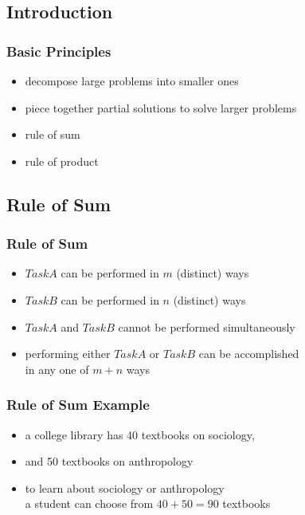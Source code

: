 \documentclass[dvipsnames]{beamer}
\begin{document}
\subsection{Introduction}

\begin{frame}
  \frametitle{Basic Principles}

  \begin{itemize}
    \item decompose large problems into smaller ones
    \item piece together partial solutions to solve larger problems

    \pause
    \bigskip
    \item rule of sum
    \item rule of product
  \end{itemize}
\end{frame}

\subsection{Rule of Sum}

\begin{frame}
  \frametitle{Rule of Sum}

  \begin{itemize}
    \item $TaskA$ can be performed in $m$ (distinct) ways
    \item $TaskB$ can be performed in $n$ (distinct) ways
    \item $TaskA$ and $TaskB$ cannot be performed simultaneously

    \pause
    \bigskip
    \item performing either $TaskA$ or $TaskB$ can be accomplished\\
      in any one of $m+n$ ways
  \end{itemize}
\end{frame}

\begin{frame}
  \frametitle{Rule of Sum Example}

  \begin{itemize}
    \item a college library has 40 textbooks on sociology,
    \item and 50 textbooks on anthropology

    \medskip
    \item to learn about sociology or anthropology\\
      a student can choose from $40 + 50 = 90$ textbooks
  \end{itemize}
\end{frame}
\end{document}
